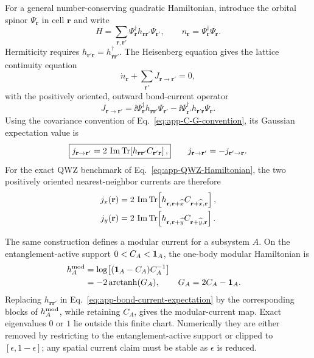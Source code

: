 For a general number-conserving quadratic Hamiltonian, introduce the orbital
spinor \(\Psi_{\mathbf r}\) in cell \(\mathbf r\) and write
\begin{equation}
    H=\sum_{\mathbf r,\mathbf r'}
      \Psi_{\mathbf r}^\dagger
      h_{\mathbf r\mathbf r'}\Psi_{\mathbf r'},
    \qquad
    n_{\mathbf r}=\Psi_{\mathbf r}^\dagger\Psi_{\mathbf r}.
    \label{eq:app-general-quadratic-H}
\end{equation}
Hermiticity requires
\(h_{\mathbf r'\mathbf r}=h_{\mathbf r\mathbf r'}^\dagger\).  The
Heisenberg equation gives the lattice continuity equation
\begin{equation}
    \dot n_{\mathbf r}
    +\sum_{\mathbf r'}J_{\mathbf r\to\mathbf r'}=0,
    \label{eq:app-lattice-continuity}
\end{equation}
with the positively oriented, outward bond-current operator
\begin{equation}
    J_{\mathbf r\to\mathbf r'}
    =\ii\Psi_{\mathbf r}^\dagger
       h_{\mathbf r\mathbf r'}\Psi_{\mathbf r'}
     -\ii\Psi_{\mathbf r'}^\dagger
       h_{\mathbf r'\mathbf r}\Psi_{\mathbf r}.
    \label{eq:app-bond-current-operator}
\end{equation}
Using the covariance convention of Eq.~\eqref{eq:app-C-G-convention}, its
Gaussian expectation value is
\begin{equation}
    \boxed{
    j_{\mathbf r\to\mathbf r'}
    =2\,\operatorname{Im}\operatorname{Tr}\!\left[
      h_{\mathbf r\mathbf r'}C_{\mathbf r'\mathbf r}\right],}
    \qquad
    j_{\mathbf r\to\mathbf r'}=-j_{\mathbf r'\to\mathbf r}.
    \label{eq:app-bond-current-expectation}
\end{equation}
For the exact QWZ benchmark of Eq.~\eqref{eq:app-QWZ-Hamiltonian}, the two
positively oriented nearest-neighbor currents are therefore
\begin{align}
    j_x(\mathbf r)
    &=2\,\operatorname{Im}\operatorname{Tr}\!\left[
      h_{\mathbf r,\mathbf r+\widehat x}
      C_{\mathbf r+\widehat x,\mathbf r}\right],\nonumber\\
    j_y(\mathbf r)
    &=2\,\operatorname{Im}\operatorname{Tr}\!\left[
      h_{\mathbf r,\mathbf r+\widehat y}
      C_{\mathbf r+\widehat y,\mathbf r}\right].
    \label{eq:app-QWZ-link-currents}
\end{align}

The same construction defines a modular current for a subsystem \(A\).  On
the entanglement-active support \(0<C_A<\mathbf{1}_A\), the one-body modular
Hamiltonian is
\begin{align}
    h_A^{\rm mod}
    &=\log\!\left[(\mathbf{1}_A-C_A)C_A^{-1}\right]\nonumber\\
    &=-2\operatorname{arctanh}(G_A),
    &G_A&=2C_A-\mathbf{1}_A .
    \label{eq:app-modular-Hamiltonian}
\end{align}
Replacing \(h_{\mathbf r\mathbf r'}\) in
Eq.~\eqref{eq:app-bond-current-expectation} by the corresponding blocks of
\(h_A^{\rm mod}\), while retaining \(C_A\), gives the modular-current map.
Exact eigenvalues \(0\) or \(1\) lie outside this finite chart.  Numerically
they are either removed by restricting to the entanglement-active support or
clipped to \([\epsilon,1-\epsilon]\); any spatial current claim must be stable
as \(\epsilon\) is reduced.

